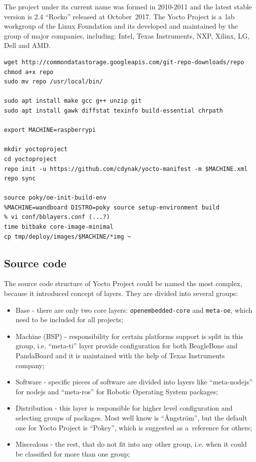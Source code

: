 \documentclass[printmode]{mgr}
\begin{document}
The project under its current name was formed in 2010-2011 and the latest stable version is 2.4 ``Rocko'' released at October~2017. The Yocto Project is a~lab workgroup of the Linux Foundation and its developed and maintained by the group of major companies, including: Intel, Texas Instruments, NXP, Xilinx, LG, Dell and AMD.\cite{web:yoctoproject-participants}\cite{web:yoctoproject-leadership}







\begin{lstlisting}
wget http://commondatastorage.googleapis.com/git-repo-downloads/repo
chmod a+x repo
sudo mv repo /usr/local/bin/

sudo apt install make gcc g++ unzip git
sudo apt install gawk diffstat texinfo build-essential chrpath

export MACHINE=raspberrypi

mkdir yoctoproject
cd yoctoproject
repo init -u https://github.com/cdynak/yocto-manifest -m $MACHINE.xml
repo sync

source poky/oe-init-build-env
%MACHINE=wandboard DISTRO=poky source setup-environment build
% vi conf/bblayers.conf (...?)
time bitbake core-image-minimal
cp tmp/deploy/images/$MACHINE/*img ~
\end{lstlisting}


\subsection*{Source code}

The source code structure of Yocto Project could be named the most complex, because it introduced concept of layers.
They are divided into several groups:
\begin{itemize}
    \item Base - there are only two core layers: \verb|openembedded-core| and \verb|meta-oe|, which need to be included for all projects;
    \item Machine (BSP) - responsibility for certain platforms support is split in this group, i.e. ``meta-ti'' layer provide configuration for both BeagleBone and PandaBoard and it is maintained with the help of Texas Instruments company;
    \item Software - specific pieces of software are divided into layers like ``meta-nodejs'' for nodejs and ``meta-ros'' for Robotic Operating System packages;
    \item Distribution - this layer is responsible for higher level configuration and selecting groups of packages. Most well know is ``Ångström'', but the default one for Yocto Project is ``Pokey'', which is suggested as a~reference for others;
    \item Miscealous - the rest, that do not fit into any other group, i.e. when it could be classified for more than one group;
\end{itemize}
\end{document}
